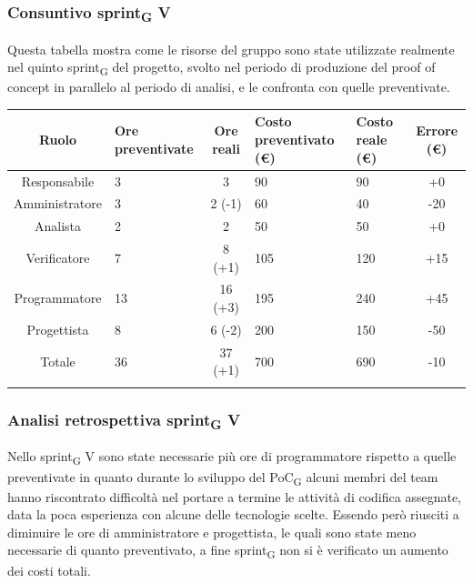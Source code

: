 
\newpage
\subsubsection{Consuntivo sprint\textsubscript{G} V}
Questa tabella mostra come le risorse del gruppo sono state utilizzate realmente nel quinto sprint\textsubscript{G} del progetto, svolto nel periodo di produzione del proof of concept in parallelo al periodo di analisi, e le confronta con quelle preventivate.

\setlength\extrarowheight{5pt}
\begin{tabularx}{\textwidth}{|c|XcXX|c|}
	\hline
	\rowcolor{white}
	\textbf{Ruolo} & \textbf{Ore preventivate} & \textbf{Ore reali} & \textbf{Costo preventivato (€)} & \textbf{Costo reale (€)} & \textbf{Errore (€)} \\
	\hline
	Responsabile &3&3&90&90&+0\\
	Amministratore &3&2 (-1)&60&40&-20\\
	Analista &2&2&50&50&+0\\
	Verificatore &7&8 (+1)&105&120&+15\\
	Programmatore &13&16 (+3)&195&240&+45\\
	Progettista &8&6 (-2)&200&150&-50 \\
	\hline
	Totale &36&37 (+1)&700&690&-10\\
	\hline
	\rowcolor{white}
	\caption{Consuntivo ore e costi per ruolo del quinto sprint\textsubscript{G}}
\end{tabularx}
\subsubsection{Analisi retrospettiva sprint\textsubscript{G} V}
Nello sprint\textsubscript{G} V sono state necessarie più ore di programmatore rispetto a quelle preventivate in quanto durante lo sviluppo del PoC\textsubscript{G} alcuni membri del team hanno riscontrato difficoltà nel portare a termine le attività di codifica assegnate, data la poca esperienza con alcune delle tecnologie scelte. Essendo però riusciti a diminuire le ore di amministratore e progettista, le quali sono state meno necessarie di quanto preventivato, a fine sprint\textsubscript{G} non si è verificato un aumento dei costi totali.
\newpage
